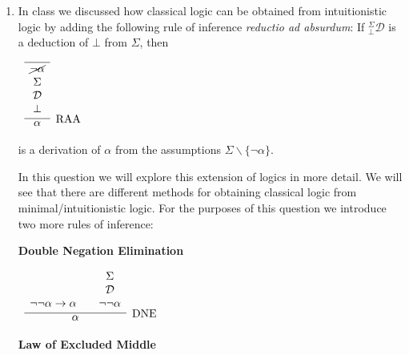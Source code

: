 \documentclass[11pt]{report}
\begin{document}
\begin{enumerate}
	\vfill
	\hfill \textbf{PTO}
	\newpage
	
	\item In class we discussed how classical logic can be obtained from intuitionistic logic by adding the following rule of inference \emph{reductio ad absurdum}: If $^{\Sigma}_{\bot}\mathcal{D}$ is a deduction of $\bot$ from $\Sigma$, then
	
	\begin{center}		
		$\begin{array}{c}		
		\infer[\text{RAA}]{\alpha}
		{\begin{array}{c} \hline \cancel{\lnot\alpha} \\ \Sigma \\ \mathcal{D} \\ \bot \end{array}}
		\end{array}$
	\end{center}
	
	is a derivation of $\alpha$ from the assumptions $\Sigma \backslash\{\lnot\alpha\}$.

	In this question we will explore this extension of logics in more detail. We will see that there are different methods for obtaining classical logic from minimal/intuitionistic logic.	For the purposes of this question we introduce two more rules of inference: 

	\begin{center}
		\begin{minipage}{0.45\textwidth}
		\centering

			\textbf{Double Negation Elimination}

			$\begin{array}{ c }
			\infer[\text{DNE}]{\alpha}
			{
			\begin{array}{c} \  \\ \ \\ \lnot \lnot\alpha \to \alpha \end{array}
			& 
			\begin{array}{c} \Sigma  \\ \mathcal{D} \\ \lnot \lnot\alpha \end{array}							 
			}
			\end{array}$
		\end{minipage}%
	\hfill
		\begin{minipage}{0.45\textwidth}
		\centering

			\textbf{Law of Excluded Middle}


\end{minipage}
\end{center}
\end{enumerate}
\end{document}
